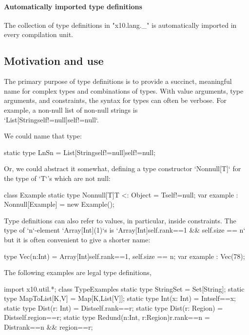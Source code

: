 \paragraph{Automatically imported type definitions}
\label{X10LangUnderscore}

The collection of type definitions in
\xcdmath"x10.lang._" is automatically imported in every compilation unit.


\subsection{Motivation and use}
The primary purpose of type definitions is to provide a succinct,
meaningful name for complex types
and combinations of types. 
With value arguments, type arguments, and constraints, the syntax for \Xten{}
types can often be verbose. 
For example, a non-null list of non-null strings is \\
\xcd`List[String{self!=null}]{self!=null}`.

We could name that type: 
% 
\begin{xten}
static type LnSn = List[String{self!=null}]{self!=null};
\end{xten}
Or, we could abstract it somewhat, defining a type constructor
\xcd`Nonnull[T]` for the type of \xcd`T`'s which are not null:
% 
\begin{xten}
class Example {
  static type Nonnull[T]{T <: Object}  = T{self!=null};
  var example : Nonnull[Example] = new Example();
}
\end{xten}
%

Type definitions can also refer to values, in particular, inside 
constraints.  The type of \xcd`n`-element \xcd`Array[Int](1)`s  is 
\xcd`Array[Int]{self.rank==1 && self.size == n}`
but it is often convenient to give a shorter name: 
\begin{xten}
type Vec(n:Int) = Array[Int]{self.rank==1, self.size == n}; 
var example : Vec(78); 
\end{xten}

%
The following examples are legal type definitions, 
% 
\begin{xten}
import x10.util.*;
class TypeExamples {
  static type StringSet = Set[String];
  static type MapToList[K,V] = Map[K,List[V]];
  static type Int(x: Int) = Int{self==x};
  static type Dist(r: Int) = Dist{self.rank==r};
  static type Dist(r: Region) = Dist{self.region==r};
  static type Redund(n:Int, r:Region){r.rank==n} 
      = Dist{rank==n && region==r};
}
\end{xten}
% 

